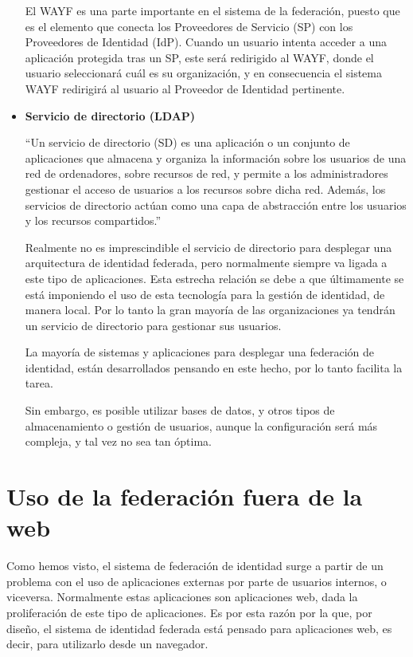 \begin{itemize}
    El WAYF es una parte importante en el sistema de la federación,
    puesto que es el elemento que conecta los Proveedores de
    Servicio (SP) con los Proveedores de Identidad (IdP). Cuando un
    usuario intenta acceder a una aplicación protegida tras un SP,
    este será redirigido al WAYF, donde el usuario seleccionará cuál
    es su organización, y en consecuencia el sistema WAYF redirigirá
    al usuario al Proveedor de Identidad pertinente.

            \item \textbf{Servicio de directorio (LDAP)}

    ``Un servicio de directorio (SD) es una aplicación o un conjunto
    de aplicaciones que almacena y organiza la información sobre los
    usuarios de una red de ordenadores, sobre recursos de red, y
    permite a los administradores gestionar el acceso de usuarios a
    los recursos sobre dicha red. Además, los servicios de directorio
    actúan como una capa de abstracción entre los usuarios y los
    recursos compartidos.''

    Realmente no es imprescindible el servicio de directorio para
    desplegar una arquitectura de identidad federada, pero normalmente
    siempre va ligada a este tipo de aplicaciones. Esta estrecha
    relación se debe a que últimamente se está imponiendo el uso de
    esta tecnología para la gestión de identidad, de manera local. Por
    lo tanto la gran mayoría de las organizaciones ya tendrán un
    servicio de directorio para gestionar sus usuarios.

    La mayoría de sistemas y aplicaciones para desplegar una
    federación de identidad, están desarrollados pensando en este
    hecho, por lo tanto facilita la tarea.

    Sin embargo, es posible utilizar bases de datos, y otros tipos de
    almacenamiento o gestión de usuarios, aunque la configuración será
    más compleja, y tal vez no sea tan óptima.

            \end{itemize}

    \section{Uso de la federación fuera de la web}

    Como hemos visto, el sistema de federación de identidad surge a partir
    de un problema con el uso de aplicaciones externas por parte de
    usuarios internos, o viceversa. Normalmente estas aplicaciones son
    aplicaciones web, dada la proliferación de este tipo de aplicaciones.
    Es por esta razón por la que, por diseño, el sistema de identidad
    federada está pensado para aplicaciones web, es decir, para utilizarlo
    desde un navegador.

